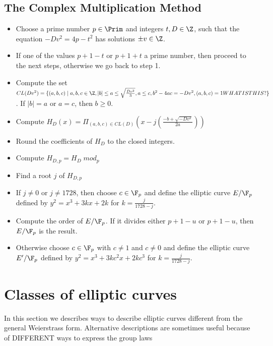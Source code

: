 \subsection{The Complex Multiplication Method}
\begin{itemize}
\item Choose a prime number $p\in\Prim$ and integers $t,D\in\Z$, such that the equation $-Dv^2 = 4p - t^2$ has solutions $\pm v \in \Z$.
\item If one of the values $p+1-t$ or $p+1+t$ a prime number, then proceed to the next steps, otherwise we go back to step 1.
\item Compute the set $CL(Dv^2)=\{(a,b,c)\;|\; a,b,c\in\Z, |b|\leq a \leq \sqrt{\frac{Dv^2}{3}},a\leq c, b^2-4ac=-Dv^2, (a,b,c)=1WHATISTHIS?\}$. If $|b|=a$ or $a=c$, then $b\geq 0$.
\item Compute $H_D(x)=\Pi_{(a,b,c)\in CL(D)} (x-j(\frac{-b+\sqrt{-Dv^2}}{2a}))$
\item Round the coefficients of $H_D$ to the closed integers.
\item Compute $H_{D,p} =H_D \; mod_p$
\item Find a root $j$ of $H_{D,p}$ 
\item If $j\neq 0$ or $j\neq 1728$, then choose $c\in \F_p$ and define the elliptic curve $E/\F_p$ defined by $y^2 = x^3 + 3kx+2k$ for $k= \frac{j}{1728-j}$.
\item Compute the order of $E/\F_p$. If it divides either $p+1-u$ or $p+1-u$, then $E/\F_p$ is the result.
\item Otherwise choose $c\in \F_p$ with $c\neq 1$ and $c\neq 0$ and define the elliptic curve $E'/\F_p$ defined by $y^2 = x^3 + 3kc^2x+2kc^3$ for $k= \frac{j}{1728-j}$.
\end{itemize}
\section{Classes of elliptic curves}
In this section we describes ways to describe elliptic curves different from the general Weierstrass form. Alternative descriptions are sometimes useful because of DIFFERENT ways to express the group laws


